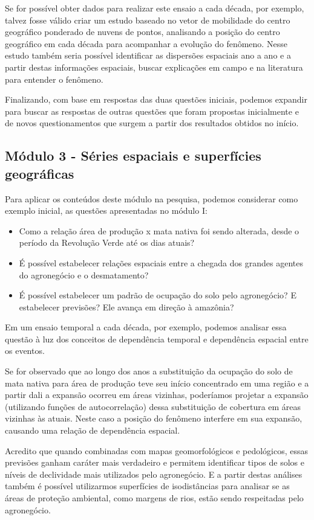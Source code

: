 Se for possível obter dados para realizar este ensaio a cada década, por exemplo, talvez fosse válido criar um estudo baseado no vetor de mobilidade do centro geográfico ponderado de nuvens de pontos, analisando a posição do centro geográfico em cada década para acompanhar a evolução do fenômeno. Nesse estudo também seria possível identificar as dispersões espaciais ano a ano e a partir destas informações espaciais, buscar explicações em campo e na literatura para entender o fenômeno.

Finalizando, com base em respostas das duas questões iniciais, podemos expandir para buscar as respostas de outras questões que foram propostas inicialmente e de novos questionamentos que surgem a partir dos resultados obtidos no início.

\subsection{Módulo 3 - Séries espaciais e superfícies geográficas}

Para aplicar os conteúdos deste módulo na pesquisa, podemos considerar como exemplo inicial, as questões apresentadas no módulo I:

\begin{itemize}
  \item Como a relação área de produção x mata nativa foi sendo alterada, desde o período da Revolução Verde até os dias atuais?
  \item É possível estabelecer relações espaciais entre a chegada dos grandes agentes do agronegócio e o desmatamento?
  \item É possível estabelecer um padrão de ocupação do solo pelo agronegócio? E estabelecer previsões? Ele avança em direção à amazônia?
\end{itemize}

Em um ensaio temporal a cada década, por exemplo, podemos analisar essa questão à luz dos conceitos de dependência temporal e dependência espacial entre os eventos.

Se for observado que ao longo dos anos a substituição da ocupação do solo de mata nativa para área de produção teve seu início concentrado em uma região e a partir dali a expansão ocorreu em áreas vizinhas, poderíamos projetar a expansão (utilizando funções de autocorrelação) dessa substituição de cobertura em áreas vizinhas às atuais. Neste caso a posição do fenômeno interfere em sua expansão, causando uma relação de dependência espacial.

Acredito que quando combinadas com mapas geomorfológicos e pedológicos, essas previsões ganham caráter mais verdadeiro e permitem identificar tipos de solos e níveis de declividade mais utilizados pelo agronegócio. E a partir destas análises também é possível utilizarmos superfícies de isodistâncias para analisar se as áreas de proteção ambiental, como margens de rios, estão sendo respeitadas pelo agronegócio.

